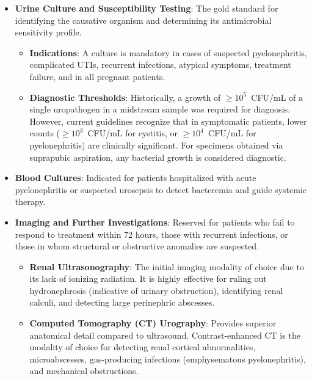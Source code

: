 \begin{itemize}
\begin{itemize}
        \item \textbf{Microscopic Urinalysis}: Allows for the direct visualization of urinary sediment. Significant pyuria is typically defined as $\ge 10$~WBCs per high-power field (HPF) in uncentrifuged urine. Microscopic hematuria and the presence of visible bacteriuria under high power support the diagnosis. The presence of white blood cell casts is diagnostic of pyelonephritis, indicating that the inflammatory response is originating from the renal tubules.
    \end{itemize}
    \item \textbf{Urine Culture and Susceptibility Testing}: The gold standard for identifying the causative organism and determining its antimicrobial sensitivity profile.
    \begin{itemize}
        \item \textbf{Indications}: A culture is mandatory in cases of suspected pyelonephritis, complicated UTIs, recurrent infections, atypical symptoms, treatment failure, and in all pregnant patients.
        \item \textbf{Diagnostic Thresholds}: Historically, a growth of $\ge 10^5$~CFU/mL of a single uropathogen in a midstream sample was required for diagnosis. However, current guidelines recognize that in symptomatic patients, lower counts ($\ge 10^3$~CFU/mL for cystitis, or $\ge 10^4$~CFU/mL for pyelonephritis) are clinically significant. For specimens obtained via suprapubic aspiration, any bacterial growth is considered diagnostic.
    \end{itemize}
    \item \textbf{Blood Cultures}: Indicated for patients hospitalized with acute pyelonephritis or suspected urosepsis to detect bacteremia and guide systemic therapy.
    \item \textbf{Imaging and Further Investigations}: Reserved for patients who fail to respond to treatment within 72 hours, those with recurrent infections, or those in whom structural or obstructive anomalies are suspected.
    \begin{itemize}
        \item \textbf{Renal Ultrasonography}: The initial imaging modality of choice due to its lack of ionizing radiation. It is highly effective for ruling out hydronephrosis (indicative of urinary obstruction), identifying renal calculi, and detecting large perinephric abscesses.
        \item \textbf{Computed Tomography (CT) Urography}: Provides superior anatomical detail compared to ultrasound. Contrast-enhanced CT is the modality of choice for detecting renal cortical abnormalities, microabscesses, gas-producing infections (emphysematous pyelonephritis), and mechanical obstructions.

\end{itemize}
\end{itemize}
